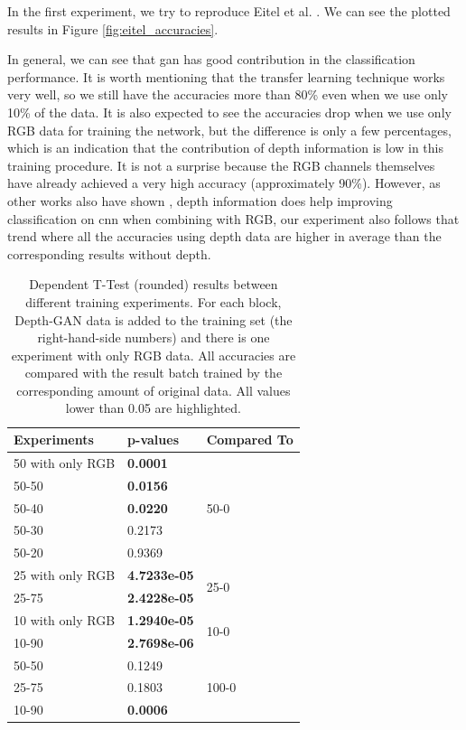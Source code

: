 In the first experiment, we try to reproduce Eitel et al. \cite{eitel}. We can
see the plotted results in Figure \ref{fig:eitel_accuracies}.

In general, we can see that \acrshort{gan} has good contribution in the classification
performance. It is worth mentioning that the transfer learning technique works very well,
so we still have the accuracies more than 80\% even when we use only 10\% of the data. It
is also expected to see the accuracies drop when we use only RGB data for training the
network, but the difference is only a few percentages, which is an indication that the
contribution of depth information is low in this training procedure. It is not a surprise
because the RGB channels themselves have already achieved a very high accuracy
(approximately 90\%). However, as other works also have shown \cite{eitel, alexandre},
depth information does help improving classification on \acrfull{cnn} when combining with
RGB, our experiment also follows that trend where all the accuracies using depth data are
higher in average than the corresponding results without depth.

\begin{table}[h!]
	\centering
	\caption{Dependent T-Test (rounded) results between different training experiments.
		For each block, Depth-GAN data is added to the training set (the
		right-hand-side numbers) and there is one experiment with only RGB data. All
		accuracies are compared with the result batch trained by the corresponding amount
		of original data. All values lower than 0.05 are highlighted.}
	\label{tab:t_test}
	\begin{tabular}{|l|l|l|}
		\hline
		Experiments      & p-values                        & Compared To            \\ \hline
		50 with only RGB & \textbf{0.0001} & \multirow{5}{*}{50-0}  \\ \cline{1-2}
		50-50            & \textbf{0.0156}   &                        \\ \cline{1-2}
		50-40            & \textbf{0.0220}   &                        \\ \cline{1-2}
		50-30            & 0.2173 			 &                        \\ \cline{1-2}
		50-20            & 0.9369 			 &                        \\ \hline
		25 with only RGB & \textbf{4.7233e-05} & \multirow{2}{*}{25-0}  \\ \cline{1-2}
		25-75            & \textbf{2.4228e-05} &                        \\ \hline
		10 with only RGB & \textbf{1.2940e-05}  & \multirow{2}{*}{10-0}  \\ \cline{1-2}
		10-90            & \textbf{2.7698e-06} &                        \\ \hline
		50-50            & 0.1249				& \multirow{3}{*}{100-0} \\ \cline{1-2}
		25-75            & 0.1803				&                        \\ \cline{1-2}
		10-90            & \textbf{0.0006}  	&                        \\ \hline
	\end{tabular}
\end{table}

